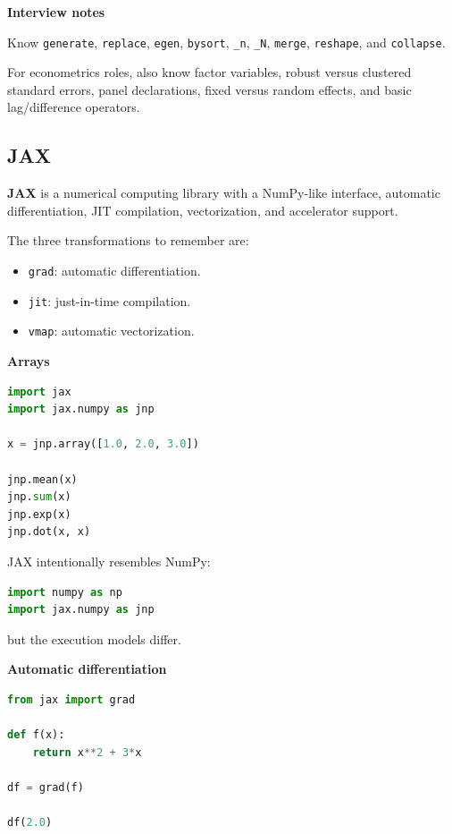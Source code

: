 \documentclass[11pt,letterpaper]{article}
\begin{document}
\textbf{Interview notes}

Know \texttt{generate}, \texttt{replace}, \texttt{egen}, \texttt{bysort},
\texttt{\_n}, \texttt{\_N}, \texttt{merge}, \texttt{reshape}, and
\texttt{collapse}.

For econometrics roles, also know factor variables, robust versus clustered
standard errors, panel declarations, fixed versus random effects, and basic
lag/difference operators.



\subsection{JAX}

\textbf{JAX} is a numerical computing library with a NumPy-like interface,
automatic differentiation, JIT compilation, vectorization, and accelerator
support.

The three transformations to remember are:

\begin{itemize}[leftmargin=*]
    \item \texttt{grad}: automatic differentiation.
    \item \texttt{jit}: just-in-time compilation.
    \item \texttt{vmap}: automatic vectorization.
\end{itemize}

\textbf{Arrays}

\begin{lstlisting}[language=Python]
import jax
import jax.numpy as jnp

x = jnp.array([1.0, 2.0, 3.0])

jnp.mean(x)
jnp.sum(x)
jnp.exp(x)
jnp.dot(x, x)
\end{lstlisting}

JAX intentionally resembles NumPy:

\begin{lstlisting}[language=Python]
import numpy as np
import jax.numpy as jnp
\end{lstlisting}

but the execution models differ.

\textbf{Automatic differentiation}

\begin{lstlisting}[language=Python]
from jax import grad

def f(x):
    return x**2 + 3*x

df = grad(f)

df(2.0)
\end{lstlisting}
\end{document}
